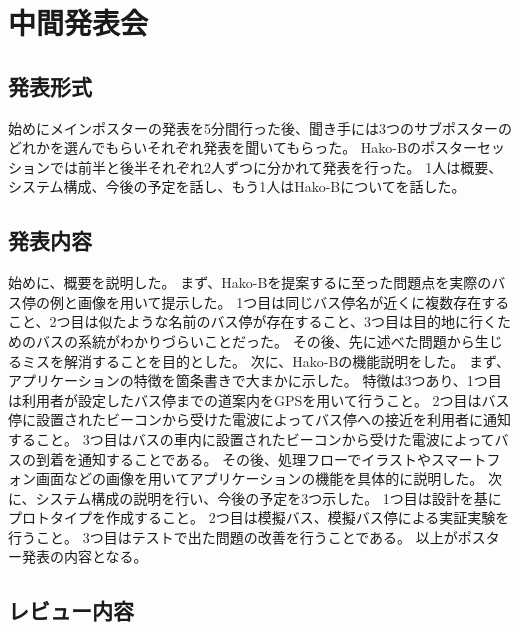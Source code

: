 \documentclass[openany,11pt,papersize]{jsbook}
\begin{document}

\section{中間発表会}
\subsection{発表形式}
始めにメインポスターの発表を5分間行った後、聞き手には3つのサブポスターのどれかを選んでもらいそれぞれ発表を聞いてもらった。
Hako-Bのポスターセッションでは前半と後半それぞれ2人ずつに分かれて発表を行った。
1人は概要、システム構成、今後の予定を話し、もう1人はHako-Bについてを話した。


\subsection{発表内容}
始めに、概要を説明した。
まず、Hako-Bを提案するに至った問題点を実際のバス停の例と画像を用いて提示した。
1つ目は同じバス停名が近くに複数存在すること、2つ目は似たような名前のバス停が存在すること、3つ目は目的地に行くためのバスの系統がわかりづらいことだった。
その後、先に述べた問題から生じるミスを解消することを目的とした。
次に、Hako-Bの機能説明をした。
まず、アプリケーションの特徴を箇条書きで大まかに示した。
特徴は3つあり、1つ目は利用者が設定したバス停までの道案内をGPSを用いて行うこと。
2つ目はバス停に設置されたビーコンから受けた電波によってバス停への接近を利用者に通知すること。
3つ目はバスの車内に設置されたビーコンから受けた電波によってバスの到着を通知することである。
その後、処理フローでイラストやスマートフォン画面などの画像を用いてアプリケーションの機能を具体的に説明した。
次に、システム構成の説明を行い、今後の予定を3つ示した。
1つ目は設計を基にプロトタイプを作成すること。
2つ目は模擬バス、模擬バス停による実証実験を行うこと。
3つ目はテストで出た問題の改善を行うことである。
以上がポスター発表の内容となる。


\subsection{レビュー内容}
\end{document}
